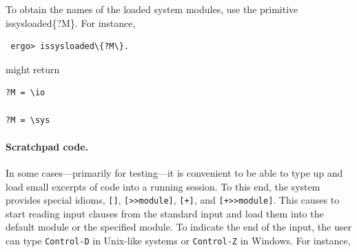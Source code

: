 \documentclass[11pt]{article}
\newcommand{\ERGO}{\mbox{\smaller{\ensuremath{\cal{E}}\smaller{{\sc{RGO}}}}}\xspace}
\newcommand{\FLSYSTEM}{\ERGO}
\newcommand{\comment}[1]{}
\begin{document}
\comment{
The 4-place version of \texttt{isloaded} also leads to
the following very useful idiom. Suppose one has files \texttt{foo}   and
\texttt{bar} in the same directory \texttt{dir}.
The file \texttt{foo} is loaded and it
in turn needs to add \texttt{bar}. One could write something like this:
\begin{alltt}
    \emph{In file foo}:  
           ....
           ?- [+bar].
           ....
\end{alltt}
Unfortunately, this version is not portable because, if \texttt{bar} is a
local name then \texttt{foo} must be loaded when the current directory is
\texttt{dir} --- a serious limitation. Indeed, since \texttt{bar} is a
local name, the add command will not find \texttt{bar} (or will find a
wrong bar), if the current directory is not \texttt{dir}.
Writing \texttt{bar} as an absolute name is even worse. Yes, this will not
be directory-dependent, but only for the author of the above snippet.
Giving this snippet to a different user (who might have a different
directory structure) or moving the snippet, say, from Windows to Linux will
require editing and changing the name each time. It is generally considered
unprofessional (and unacceptable commercially) to depend on full path names.
The \texttt{isloaded} primitive to the rescue:
\begin{verbatim}
    ?- isloaded{?FullFile,\@,\@F,?},
       File[dirname(?FullFile)->?Dir]@\io,
       \symbol[concat([?Dir,bar]) -> ?BarFullName]@\basetype,
       [+?BarFullName].
\end{verbatim}
The remaining ingredients of this recipe are self-explanatory, but look
them up in this manual if they are not.
}

To obtain the names of the loaded system modules, use the primitive
issysloaded\{?M\}. For instance,
\begin{verbatim}
 ergo> issysloaded\{?M\}.
\end{verbatim}
might return
\begin{verbatim}
?M = \io

?M = \sys
\end{verbatim}


\paragraph{Scratchpad code.}
In some cases---primarily for testing---it is convenient to be able to type
up and load small excerpts of code into a running \FLSYSTEM session.
To this end, the system provides special idioms, \verb|[]|,
\verb|[>>module]|, \verb|[+]|, and \verb|[+>>module]|. This causes
\FLSYSTEM to start reading input clauses
from the standard input and load them into the default module or the
specified module. To indicate the end of the input, the user can type
{\tt Control-D} in Unix-like systems or {\tt Control-Z} in Windows.  
For instance,
\end{document}
